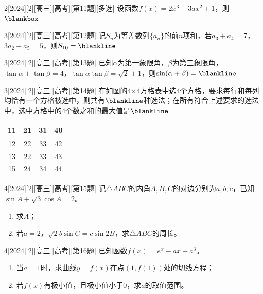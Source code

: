 \begin{example}{2}[2024][2][高三][高考][第11题][多选]
设函数$f(x)=2x^3-3ax^2+1$，则$\blankbox$
\begin{choices}
\end{choices}
\end{example}
\begin{example}{3}[2024][2][高三][高考][第12题]
记$S_n$为等差数列$\{a_n\}$的前$n$项和，若$a_3+a_4=7$，$3a_2+a_5=5$，则$S_{10}=\blankline$
\end{example}

\begin{example}{3}[2024][2][高三][高考][第13题]
已知$\alpha$为第一象限角，$\beta$为第三象限角，$\tan\alpha+\tan\beta=4$，$\tan\alpha\tan\beta=\sqrt{2}+1$，则$\sin(\alpha+\beta)=\blankline$
\end{example}

\begin{example}{3}[2024][2][高三][高考][第14题]
在如图的4×4方格表中选4个方格，要求每行和每列均恰有一个方格被选中，则共有$\blankline$种选法；在所有符合上述要求的选法中，选中方格中的4个数之和的最大值是$\blankline$
\begin{center}
\begin{tabular}{|c|c|c|c|}
\hline
11 & 21 & 31 & 40 \\
\hline
12 & 22 & 33 & 42 \\
\hline
13 & 22 & 33 & 43 \\
\hline
15 & 24 & 34 & 44 \\
\hline
\end{tabular}
\end{center}
\end{example}
\begin{example}{4}[2024][2][高三][高考][第15题]
记$\triangle ABC$的内角$A,B,C$的对边分别为$a,b,c$，已知$\sin A+\sqrt{3}\cos A=2$。
\begin{enumerate}
\item 求$A$；
\item 若$a=2$，$\sqrt{2}b\sin C=c\sin 2B$，求$\triangle ABC$的周长。
\end{enumerate}
\end{example}

\begin{example}{4}[2024][2][高三][高考][第16题]
已知函数$f(x)=e^x-ax-a^3$。
\begin{enumerate}
\item 当$a=1$时，求曲线$y=f(x)$在点$(1,f(1))$处的切线方程；
\item 若$f(x)$有极小值，且极小值小于0，求$a$的取值范围。
\end{enumerate}
\end{example}

